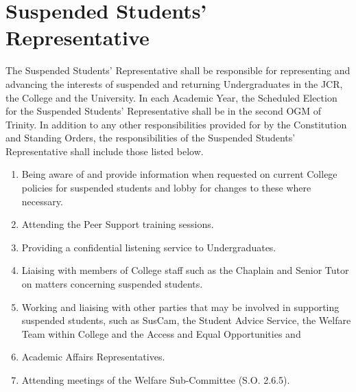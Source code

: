 \section{Suspended Students' Representative}
\npara The Suspended Students' Representative shall be responsible for representing  and advancing the interests of suspended and returning Undergraduates in the JCR, the College and the University.
\npara In each Academic Year, the Scheduled Election for the Suspended Students' Representative shall be in the second OGM of Trinity.
\npara In addition to any other responsibilities provided for by the Constitution and Standing Orders, the responsibilities of the Suspended Students' Representative shall include those listed below.
\begin{enumerate}
	\item Being aware of and provide information when requested on current College policies for suspended students and lobby for changes to these where necessary.
	\item Attending the Peer Support training sessions.
	\item Providing a confidential listening service to Undergraduates.
	\item Liaising with members of College staff such as the Chaplain and Senior Tutor on matters concerning suspended students.
	\item Working and liaising with other parties that may be involved in supporting suspended students, such as SusCam, the Student Advice Service, the Welfare Team within College and the Access and Equal Opportunities and \item Academic Affairs Representatives.
	\item Attending meetings of the Welfare Sub-Committee (S.O. 2.6.5).
\end{enumerate}
